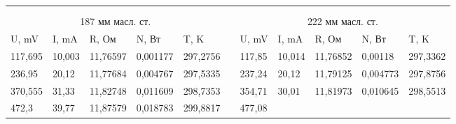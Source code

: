 \documentclass[12pt,a4paper]{article}
\begin{document}
\begin{enumerate}
{\begin{table}[p]
{\begin{tabular}{lllllllllll}
							&
							&
							&
							&
							&
							&
							&
							&
							\\
							&
							&
							&
							&
							&
							&
							&
							&
							&
							&
							\\ \cline{1-5} \cline{7-11} 
							\multicolumn{5}{|c|}{187 мм масл. ст.} &
							\multicolumn{1}{l|}{} &
							\multicolumn{5}{c|}{222 мм масл. ст.} \\ \cline{1-5} \cline{7-11} 
							\multicolumn{1}{|l|}{U, mV} &
							\multicolumn{1}{l|}{I, mA} &
							\multicolumn{1}{l|}{R, Ом} &
							\multicolumn{1}{l|}{N, Вт} &
							\multicolumn{1}{l|}{T, K} &
							\multicolumn{1}{l|}{} &
							\multicolumn{1}{l|}{U, mV} &
							\multicolumn{1}{l|}{I, mA} &
							\multicolumn{1}{l|}{R, Ом} &
							\multicolumn{1}{l|}{N, Вт} &
							\multicolumn{1}{l|}{T, K} \\ \cline{1-5} \cline{7-11} 
							\multicolumn{1}{|l|}{117,695} &
							\multicolumn{1}{l|}{10,003} &
							\multicolumn{1}{l|}{11,76597} &
							\multicolumn{1}{l|}{0,001177} &
							\multicolumn{1}{l|}{297,2756} &
							\multicolumn{1}{l|}{} &
							\multicolumn{1}{l|}{117,85} &
							\multicolumn{1}{l|}{10,014} &
							\multicolumn{1}{l|}{11,76852} &
							\multicolumn{1}{l|}{0,00118} &
							\multicolumn{1}{l|}{297,3362} \\ \cline{1-5} \cline{7-11} 
							\multicolumn{1}{|l|}{236,95} &
							\multicolumn{1}{l|}{20,12} &
							\multicolumn{1}{l|}{11,77684} &
							\multicolumn{1}{l|}{0,004767} &
							\multicolumn{1}{l|}{297,5335} &
							\multicolumn{1}{l|}{} &
							\multicolumn{1}{l|}{237,24} &
							\multicolumn{1}{l|}{20,12} &
							\multicolumn{1}{l|}{11,79125} &
							\multicolumn{1}{l|}{0,004773} &
							\multicolumn{1}{l|}{297,8756} \\ \cline{1-5} \cline{7-11} 
							\multicolumn{1}{|l|}{370,555} &
							\multicolumn{1}{l|}{31,33} &
							\multicolumn{1}{l|}{11,82748} &
							\multicolumn{1}{l|}{0,011609} &
							\multicolumn{1}{l|}{298,7353} &
							\multicolumn{1}{l|}{} &
							\multicolumn{1}{l|}{354,71} &
							\multicolumn{1}{l|}{30,01} &
							\multicolumn{1}{l|}{11,81973} &
							\multicolumn{1}{l|}{0,010645} &
							\multicolumn{1}{l|}{298,5513} \\ \cline{1-5} \cline{7-11} 
							\multicolumn{1}{|l|}{472,3} &
							\multicolumn{1}{l|}{39,77} &
							\multicolumn{1}{l|}{11,87579} &
							\multicolumn{1}{l|}{0,018783} &
							\multicolumn{1}{l|}{299,8817} &
							\multicolumn{1}{l|}{} &
							\multicolumn{1}{l|}{477,08} &

\end{tabular}}
\end{table}}
\end{enumerate}
\end{document}
